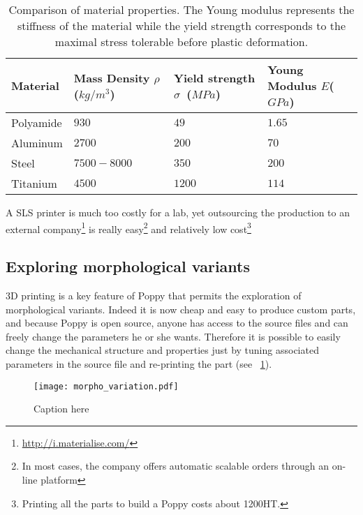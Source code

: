 \begin{table}[h]
    \centering
    \begin{tabularx}{0.8\linewidth }{l X X X}
        Material & Mass Density $\rho$ ($kg/m^3$) &  Yield strength $\sigma$~($MPa$) & Young Modulus $E$($GPa$)\\
        \hline
        Polyamide & $930$ & $49$ & $1.65$\\

        Aluminum & $2700$ & $200$ & $70$\\

        Steel & $7500-8000$ & $350$ & $200$\\

        Titanium & $4500$ & $1200$ & $114$\\

    \end{tabularx}

    \caption{Comparison of material properties.
    The Young modulus represents the stiffness of the material while the yield strength corresponds to the maximal stress tolerable before plastic deformation.}
    \label{tab:materials}
\end{table}

A SLS printer is much too costly for a lab, yet outsourcing the production to an external company\footnote{\url{http://i.materialise.com/}} is really easy\footnote{In most cases, the company offers automatic scalable orders through an on-line platform} and relatively low cost\footnote{Printing all the parts to build a Poppy costs about 1200\texteuro HT.}

\subsection{Exploring morphological variants} %
3D printing is a key feature of Poppy that permits the exploration of morphological variants. Indeed it is now cheap and easy to produce custom parts, and because Poppy is open source, anyone has access to the source files and can freely change the parameters he or she wants. Therefore it is possible to easily change the mechanical structure and properties just by tuning associated parameters in the source file and re-printing the part (see \figurename~\ref{fig:exploring-morpho-poppy}).

\begin{figure}[h]
    \begin{center}
        \texttt{[image: morpho\_variation.pdf]}
    \end{center}
    \caption{Caption here}
    \label{fig:exploring-morpho-poppy}
\end{figure}



